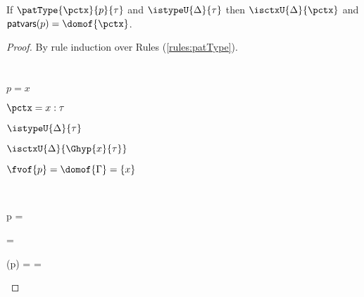 \begin{grayparbox}
\begin{lemma}\label{lemma:pattern-regularity-UP} 
If $\patType{\pctx}{p}{\tau}$ and $\istypeU{\Delta}{\tau}$ then $\isctxU{\Delta}{\pctx}$ and $\mathsf{patvars}({p}) = \domof{\pctx}$.
\end{lemma}
\begin{proof} By rule induction over Rules (\ref{rules:patType}).
\begin{byCases}
\item[\text{(\ref{rule:patType-var})}] ~
\begin{pfsteps*}
  \item $p=x$ 
  \item $\pctx=x : \tau$ 
  \item $\istypeU{\Delta}{\tau}$ 
  \item $\isctxU{\Delta}{\Ghyp{x}{\tau}}$ 
  \item $\fvof{p} = \domof{\Gamma} = \{x\}$ 
 \end{pfsteps*}
 \resetpfcounter
\item[\text{(\ref{rule:patType-wild})}] ~
\begin{pfsteps}
\item p = \aewildp {}
\item \pctx=\emptyset {}
\item \isctxU{\Delta}{\emptyset} 
\item {}({p}) = \domof{\Gamma} = \emptyset {}
\end{pfsteps}
\resetpfcounter


\end{byCases}
\end{proof}
\end{grayparbox}
